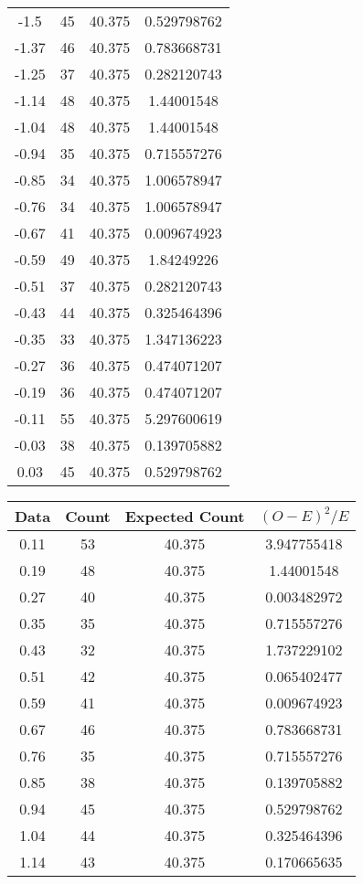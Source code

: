 \begin{center}
{\begin{tabular}{|c|c|c|c|}
-1.5	&	45	&	40.375	&	0.529798762	\\
-1.37	&	46	&	40.375	&	0.783668731	\\
-1.25	&	37	&	40.375	&	0.282120743	\\
-1.14	&	48	&	40.375	&	1.44001548	\\
-1.04	&	48	&	40.375	&	1.44001548	\\
-0.94	&	35	&	40.375	&	0.715557276	\\
-0.85	&	34	&	40.375	&	1.006578947	\\
-0.76	&	34	&	40.375	&	1.006578947	\\
-0.67	&	41	&	40.375	&	0.009674923	\\
-0.59	&	49	&	40.375	&	1.84249226	\\
-0.51	&	37	&	40.375	&	0.282120743	\\
-0.43	&	44	&	40.375	&	0.325464396	\\
-0.35	&	33	&	40.375	&	1.347136223	\\
-0.27	&	36	&	40.375	&	0.474071207	\\
-0.19	&	36	&	40.375	&	0.474071207	\\
-0.11	&	55	&	40.375	&	5.297600619	\\
-0.03	&	38	&	40.375	&	0.139705882	\\
0.03	&	45	&	40.375	&	0.529798762	\\
\hline
\end{tabular}
}
{\scriptsize
\begin{tabular}{|c|c|c|c|}\hline
Data	& Count&	Expected Count&	$(O-E)^2/E$\\ \hline
0.11	&	53	&	40.375	&	3.947755418	\\
0.19	&	48	&	40.375	&	1.44001548	\\
0.27	&	40	&	40.375	&	0.003482972	\\
0.35	&	35	&	40.375	&	0.715557276	\\
0.43	&	32	&	40.375	&	1.737229102	\\
0.51	&	42	&	40.375	&	0.065402477	\\
0.59	&	41	&	40.375	&	0.009674923	\\
0.67	&	46	&	40.375	&	0.783668731	\\
0.76	&	35	&	40.375	&	0.715557276	\\
0.85	&	38	&	40.375	&	0.139705882	\\
0.94	&	45	&	40.375	&	0.529798762	\\
1.04	&	44	&	40.375	&	0.325464396	\\ 
1.14	&	43	&	40.375	&	0.170665635	\\

\end{tabular}}
\end{center}
